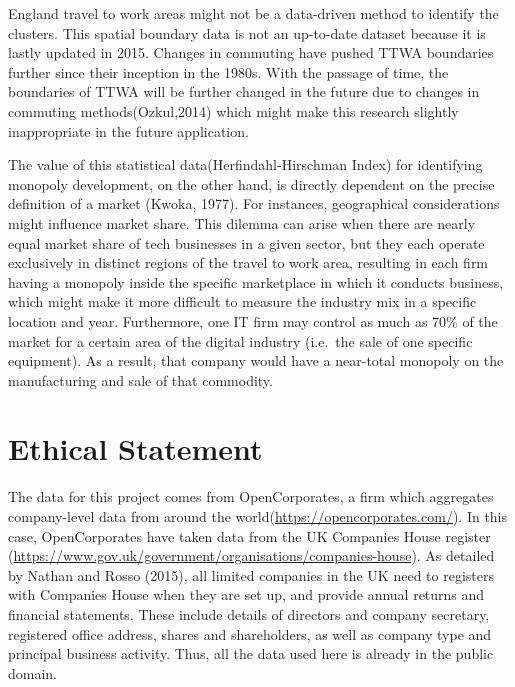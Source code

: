 \documentclass[
  12pt,
  oneside]{book}
\begin{document}
England travel to work areas might not be a data-driven method to identify the clusters. This spatial boundary data is not an up-to-date dataset because it is lastly updated in 2015. Changes in commuting have pushed TTWA boundaries further since their inception in the 1980s. With the passage of time, the boundaries of TTWA will be further changed in the future due to changes in commuting methods(Ozkul,2014) which might make this research slightly inappropriate in the future application.

The value of this statistical data(Herfindahl-Hirschman Index) for identifying monopoly development, on the other hand, is directly dependent on the precise definition of a market (Kwoka, 1977). For instances, geographical considerations might influence market share. This dilemma can arise when there are nearly equal market share of tech businesses in a given sector, but they each operate exclusively in distinct regions of the travel to work area, resulting in each firm having a monopoly inside the specific marketplace in which it conducts business, which might make it more difficult to measure the industry mix in a specific location and year. Furthermore, one IT firm may control as much as 70\% of the market for a certain area of the digital industry (i.e.~the sale of one specific equipment). As a result, that company would have a near-total monopoly on the manufacturing and sale of that commodity.

\hypertarget{ethical-statement}{%
\section{Ethical Statement}\label{ethical-statement}}

The data for this project comes from OpenCorporates, a firm which aggregates company-level data from around the world(\url{https://opencorporates.com/}). In this case, OpenCorporates have taken data from the UK Companies House register (\url{https://www.gov.uk/government/organisations/companies-house}). As detailed by Nathan and Rosso (2015), all limited companies in the UK need to registers with Companies House when they are set up, and provide annual returns and financial statements. These include details of directors and company secretary, registered office address, shares and shareholders, as well as company type and principal business activity. Thus, all the data used here is already in the public domain.
\end{document}
